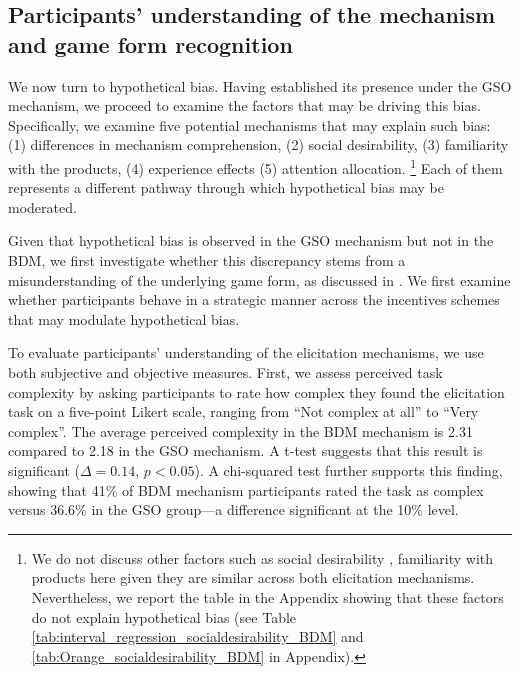\documentclass[12pt]{article}
\begin{document}
\subsection{Participants' understanding of the mechanism and game form recognition}
We now turn to hypothetical bias. Having established its presence under the GSO mechanism, we proceed to examine the factors that may be driving this bias. Specifically, we examine five potential mechanisms that may explain such bias: (1) differences in mechanism comprehension,  (2) social desirability, (3) familiarity with the products,  (4) experience effects (5) attention allocation. \footnote{We do not discuss other factors such as social desirability \citep{norwood2011social, entem2022using, lopez2021social, bursztyn2025social}, familiarity with products \citep{veettil_hypothetical_2024} here given they are similar across both elicitation mechanisms. Nevertheless, we report the table in the Appendix showing that these factors do not explain hypothetical bias (see Table \ref{tab:interval_regression_socialdesirability_BDM} and \ref{tab:Orange_socialdesirability_BDM}  in Appendix).} Each of them represents a different pathway through which hypothetical bias may be moderated.

Given that hypothetical bias is observed in the GSO mechanism but not in the BDM, we first investigate whether this discrepancy stems from a misunderstanding of the underlying game form, as discussed in \citet{cason_misconceptions_2014}. We first examine whether participants behave in a strategic manner across the incentives schemes that may modulate hypothetical bias.

To evaluate participants’ understanding of the elicitation mechanisms, we use both subjective and objective measures. First, we assess perceived task complexity by asking participants to rate how complex they found the elicitation task on a five-point Likert scale, ranging from “Not complex at all” to “Very complex”. The average perceived complexity in the BDM mechanism is 2.31 compared to 2.18 in the GSO mechanism. A t-test suggests that this result is significant (\(\Delta = 0.14\), \(p < 0.05\)). A chi-squared test further supports this finding, showing that 41\% of BDM mechanism participants rated the task as complex versus 36.6\% in the GSO group—a difference significant at the 10\% level.
\end{document}
